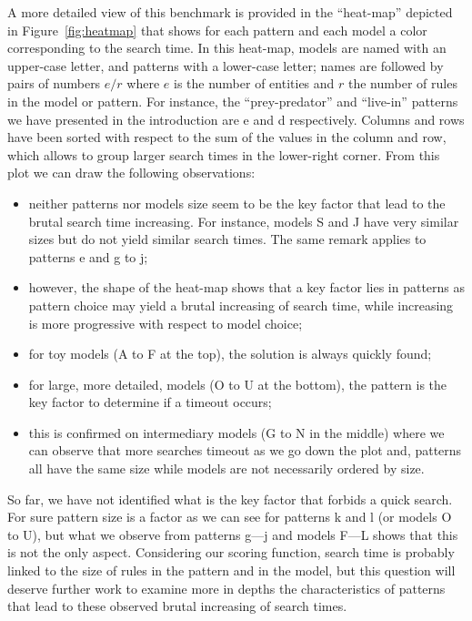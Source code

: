 \documentclass[a4paper,twoside]{article}
\begin{document}
A more detailed view of this benchmark is provided in the ``heat-map'' depicted in Figure~\ref{fig:heatmap} that shows for each pattern and each model a color corresponding to the search time.
In this heat-map, models are named with an upper-case letter, and patterns with a lower-case letter; names are followed by pairs of numbers $e/r$ where $e$ is the number of entities and $r$ the number of rules in the model or pattern.
For instance, the ``prey-predator'' and ``live-in'' patterns we have presented in the introduction are \textsf{e} and \textsf{d} respectively.
Columns and rows have been sorted with respect to the sum of the values in the column and row, which allows to group larger search times in the lower-right corner.
From this plot we can draw the following observations:
%
\begin{itemize}
\item neither patterns nor models size seem to be the key factor that lead to the brutal search time increasing. For instance, models \textsf{S} and \textsf{J} have very similar sizes but do not yield similar search times. The same remark applies to patterns \textsf{e} and \textsf{g} to \textsf{j};
\item however, the shape of the heat-map shows that a key factor lies in patterns as pattern choice may yield a brutal increasing of search time, while increasing is more progressive with respect to model choice;
\item for toy models (\textsf{A} to \textsf{F} at the top), the solution is always quickly found;
\item for large, more detailed, models (\textsf{O} to \textsf{U} at the bottom), the pattern is the key factor to determine if a timeout occurs;
\item this is confirmed on intermediary models (\textsf{G} to \textsf{N} in the middle) where we can observe that more searches timeout as we go down the plot and, patterns all have the same size while models are not necessarily ordered by size.
\end{itemize}
%
So far, we have not identified what is the key factor that forbids a quick search.
For sure pattern size is a factor as we can see for patterns \textsf{k} and \textsf{l} (or models \textsf{O} to \textsf{U}), but what we observe from patterns \textsf{g}---\textsf{j} and models \textsf{F}---\textsf{L} shows that this is not the only aspect.
Considering our scoring function, search time is probably linked to the size of rules in the pattern and in the model, but this question will deserve further work to examine more in depths the characteristics of patterns that lead to these observed brutal increasing of search times.
\end{document}
